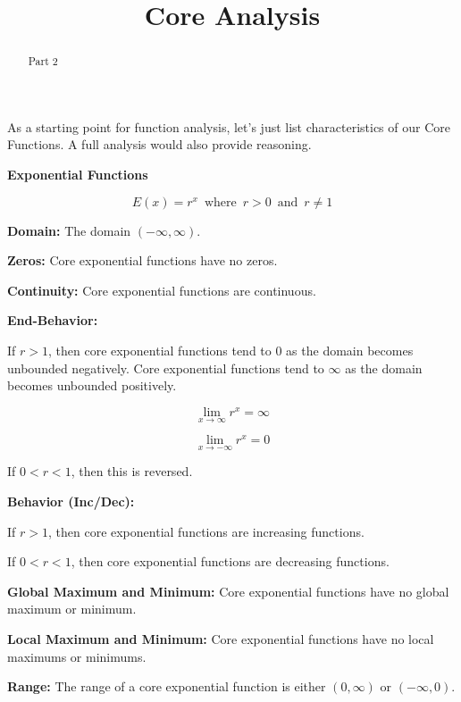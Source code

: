 \documentclass{ximera}
\title{Core Analysis}
\begin{document}
\begin{abstract}
Part 2
\end{abstract}
\maketitle




As a starting point for function analysis, let's just list characteristics of our Core Functions. A full analysis would also provide reasoning.


\begin{explanation} \textbf{\textcolor{red!75!green}{Exponential Functions}} 


\[ E(x) = r^x  \, \text{ where } \, r > 0  \, \text{ and } \, r \ne 1 \]



\textbf{Domain:} The domain $(-\infty, \infty)$.

\textbf{Zeros:} Core exponential functions have no zeros.



\textbf{Continuity:} Core exponential functions are continuous.



\textbf{End-Behavior:} 



If $r > 1$, then core exponential functions tend to $0$ as the domain becomes unbounded negatively. Core exponential functions tend to $\infty$ as the domain becomes unbounded positively.



\[
\lim\limits_{x \to \infty} r^x = \infty
\]


\[
\lim\limits_{x \to -\infty} r^x = 0
\]


If $0 < r < 1$, then this is reversed.



\textbf{Behavior (Inc/Dec):} 


If $r > 1$, then core exponential functions are increasing functions.

If $0 < r < 1$, then core exponential functions are decreasing functions.





\textbf{Global Maximum and Minimum:} Core exponential functions have no global maximum or minimum.

\textbf{Local Maximum and Minimum:}  Core exponential functions have no local maximums or minimums.

\textbf{Range:} The range of a core exponential function is either $(0,\infty)$ or $(-\infty, 0)$.

\end{explanation}
\end{document}

